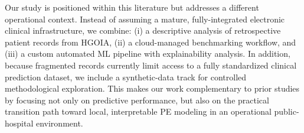 \documentclass[diagnostics,article,submit,pdftex,moreauthors]{Definitions/mdpi}
\begin{document}
Our study is positioned within this literature but addresses a
different operational context. Instead of assuming a mature,
fully-integrated electronic clinical infrastructure, we combine: (i)
a descriptive analysis of retrospective patient records from \ac{HGOIA}, (ii) a cloud-managed benchmarking workflow, and (iii) a
custom automated \ac{ML} pipeline with explainability analysis. In
addition, because fragmented records currently limit access to a fully
standardized clinical prediction dataset, we include a synthetic-data
track for controlled methodological exploration. This makes our work
complementary to prior studies by focusing not only on predictive
performance, but also on the practical transition path toward local,
interpretable \ac{PE} modeling in an operational public-hospital
environment.





\end{document}
